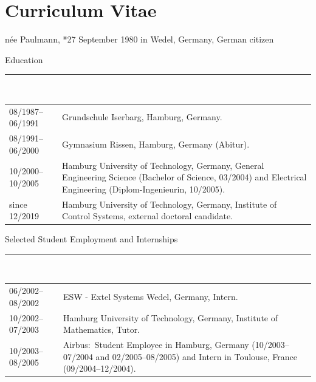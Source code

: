 \chapter*{Curriculum Vitae}
{}
 n\'ee Paulmann, *27 September 1980 in Wedel, Germany, German citizen
\bigskip



\large Education\\[-8pt]
\noindent\rule{15.25cm}{0.4pt}\\[3pt]
\normalsize
\begin{tabular}{@{}p{3.2cm}p{11.3cm}@{}} %
    08/1987--06/1991 & Grundschule Iserbarg, Hamburg, Germany. \\[5pt]
    08/1991--06/2000 & Gymnasium Rissen, Hamburg, Germany %
    (Abitur). \\ [5pt]
    10/2000--10/2005 & Hamburg University of Technology, Germany, %
    General Engineering Science (Bachelor of Science, 03/2004) and 
    Electrical Engineering (Diplom-Ingenieurin, 10/2005). \\[34pt]
    since 12/2019 & Hamburg University of Technology, Germany, Institute of Control Systems,
    external doctoral candidate.
\end{tabular}

\bigskip
\large Selected Student Employment and Internships\\[-8pt]
\noindent\rule{15.25cm}{0.4pt}\\[3pt]
\normalsize
\begin{tabular}{@{}p{3.2cm}p{11.3cm}@{}}
    06/2002--08/2002 &  ESW - Extel Systems Wedel, Germany, Intern. \\[5pt]
    10/2002--07/2003 &  Hamburg University of Technology, Germany, Institute of Mathematics,  %
    Tutor. \\[18pt]
    10/2003--08/2005 & Airbus:~Student Employee in Hamburg, Germany (10/2003--07/2004 and 02/2005--08/2005) and Intern in Toulouse, France (09/2004--12/2004).\\
\end{tabular}

